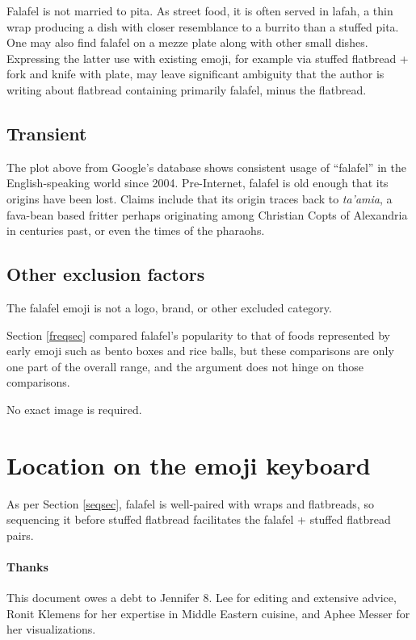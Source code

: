 \documentclass[a4paper,10pt]{article}
\begin{document}
Falafel is not married to pita. As street food, it is often served in lafah,
a thin wrap producing a dish with closer resemblance to a burrito than a
stuffed pita. One may also find falafel on a mezze plate along with other small
dishes. Expressing the latter use with existing emoji, for example via {\sc stuffed
flatbread + fork and knife with plate}, may leave significant ambiguity that the author
is writing about flatbread containing primarily falafel, minus the flatbread.

\subsection{Transient}

The plot above from Google's database shows consistent usage of ``falafel'' in the
English-speaking world since 2004. Pre-Internet, falafel is old enough that its origins
have been lost. Claims include that its origin traces back to {\em ta'amia}, a fava-bean
based fritter perhaps originating among Christian Copts of Alexandria in centuries past,
or even the times of the pharaohs.

\subsection{Other exclusion factors}
The {\sc falafel} emoji is not a logo, brand, or other excluded category. 

Section \ref{freqsec} compared falafel's popularity to that of foods represented by early
emoji such as bento boxes and rice balls, but these comparisons are only one part of the
overall range, and the argument does not hinge on those comparisons.

No exact image is required.


\section{Location on the emoji keyboard}

As per Section \ref{seqsec}, falafel is well-paired with wraps and flatbreads, so 
sequencing it before {\sc stuffed flatbread}
facilitates the {\sc falafel} + {\sc stuffed flatbread} pairs.

\vfill
\paragraph{Thanks} This document owes a debt to Jennifer 8. Lee for editing and extensive
advice, Ronit Klemens for her expertise in Middle Eastern cuisine, and Aphee Messer for her visualizations.
\end{document}

